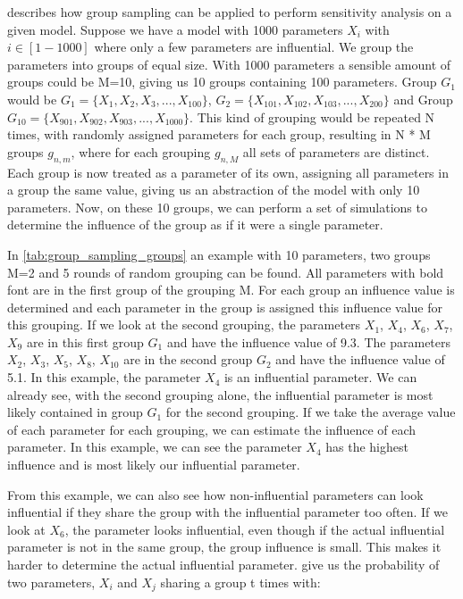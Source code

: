 \documentclass[../../thesis.tex]{subfiles}
\begin{document}
 describes how group sampling can be applied to perform sensitivity analysis on a given model.
Suppose we have a model with 1000 parameters $X_i$ with $ i\in{[1-1000]}$ where only a few parameters are influential.
We group the parameters into groups
of equal size. With 1000 parameters a sensible amount of groups could be M=10, giving us 10 groups containing 100 parameters.
Group $G_1$ would be $G_1 = \{X_1, X_2, X_3, ..., X_{100}\}$, $G_2 = \{X_{101}, X_{102}, X_{103}, ..., X_{200}\}$ and Group
$G_{10} = \{X_{901}, X_{902}, X_{903}, ..., X_{1000}\}$.
This kind of grouping would be repeated N times, with randomly assigned parameters for each group,
resulting in N * M groups $g_{n,m}$, where for each grouping $g_{n,M}$ all sets of parameters are distinct.
Each group is now treated as a parameter of its own, assigning all parameters in a group the same value,
giving us an abstraction of the model with only 10 parameters. Now, on these 10 groups, we can perform a
set of simulations to determine the influence of the group as if it were a single parameter.

In \autoref{tab:group_sampling_groups} an example with 10 parameters, two groups M=2 and 5 rounds
of random grouping can be found. All parameters with bold font are in the first group of the grouping M.
For each group an influence value is determined and each parameter in the group is assigned this influence
value for this grouping. If we look at the second grouping, the parameters $X_1$, $X_4$, $X_6$, $X_7$, $X_9$
are in this first group $G_1$ and have the influence value of 9.3.
The parameters $X_2$, $X_3$, $X_5$, $X_8$, $X_{10}$ are in the second group $G_2$ and have the influence value
of 5.1. In this example, the parameter $X_4$ is an influential parameter. We can already see, with the second
grouping alone, the influential parameter is most likely contained in group $G_1$ for the second grouping.
If we take the average value of each parameter for each grouping, we can estimate the influence of each parameter.
In this example, we can see the parameter $X_4$ has the highest influence and is most likely our influential parameter.

From this example, we can also see how non-influential parameters can look influential if they share
the group with the influential parameter too often. If we look at $X_6$, the parameter looks influential,
even though if the actual influential parameter is not in the same group, the group influence is small.
This makes it harder to determine the actual influential parameter.
 give us the probability of two parameters, $X_i$ and $X_j$ sharing a group t times with:
\end{document}
